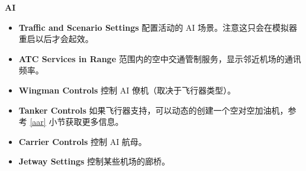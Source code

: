 \ifchinese
\item \textbf{AI}
 \begin{itemize}
  \item \textbf{Traffic and Scenario Settings} 配置活动的 AI 场景。注意这只会在模拟器重启以后才会起效。
   \item \textbf{ATC Services in Range} 范围内的空中交通管制服务，显示邻近机场的通讯频率。
   \item \textbf{Wingman Controls} 控制 AI 僚机（取决于飞行器类型）。
    \item \textbf{Tanker Controls} 如果飞行器支持，可以动态的创建一个空对空加油机，参考 \ref{aar} 小节获取更多信息。
    \item \textbf{Carrier Controls} 控制 AI 航母。
    \item \textbf{Jetway Settings} 控制某些机场的廊桥。
 \end{itemize}
\fi

{}

